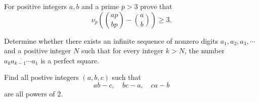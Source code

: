 \documentclass{article}
\begin{document}
\begin{prob}{9}
For positive integers $a,b$ and a prime $p>3$ prove that \[\nu_p\left( \binom{ap}{bp}-\binom ab \right)\geq 3.\]
\end{prob}

\begin{prob}[ISL 2013 N4]{13}
Determine whether there exists an infinite sequence of nonzero digits $a_1 , a_2 , a_3 , \cdots $ and a positive integer $N$ such that for every integer $k > N$, the number $\overline{a_k a_{k-1}\cdots a_1 }$ is a perfect square.
\end{prob}

\begin{prob}[IMO 2015/2]{13}
Find all postive integers $(a,b,c)$ such that \[ab-c,\quad bc-a,\quad ca-b\] are all powers of $2$.
\end{prob}
\end{document}
